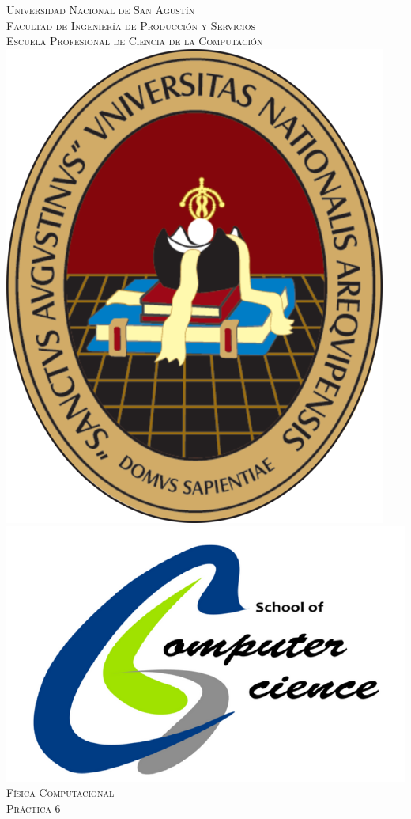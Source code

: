 \documentclass{article}
\begin{document}
\begin{titlepage}

\newcommand{\HRule}{\rule{\linewidth}{0.5mm}}

\center 

\textsc{\LARGE Universidad Nacional de San Agustín}\\[0.5cm]
\textsc{\LARGE Facultad de Ingeniería de Producción y Servicios}\\[0.5cm]
\textsc{\LARGE Escuela Profesional de Ciencia de la Computación}\\[1cm] 
\includegraphics[scale=0.85]{unsa-logo.png}\hspace{1cm}\includegraphics[scale=0.3]{cs.png}\\[1cm]
\textsc{\LARGE{Física Computacional}}\\[0.3cm] 
\textsc{\LARGE{Práctica 6}}\\[0.3cm] 



\end{titlepage}
\end{document}
